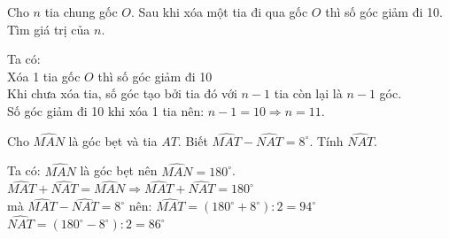 \begin{bt}
	Cho $n$ tia chung gốc $O$. Sau khi xóa một tia đi qua gốc $O$ thì số góc giảm đi 10. Tìm giá trị của $n$.
	\begin{loigiaichuong30}
		Ta có:\\
		Xóa 1 tia gốc $O$ thì số góc giảm đi 10\\
		Khi chưa xóa tia, số góc tạo bởi tia đó với $n-1$ tia còn lại là $n-1$ góc.\\
		Số góc giảm đi 10 khi xóa 1 tia nên: $n-1=10 \Rightarrow n=11$.
	\end{loigiaichuong30}
\end{bt}
\begin{bt}
	Cho $\widehat{MAN}$ là góc bẹt và tia $AT$. Biết $\widehat{MAT}-\widehat{NAT}={{8}^\circ}$. Tính $\widehat{NAT}$.
	\begin{loigiaichuong30}
		Ta có: $\widehat{MAN}$ là góc bẹt nên $\widehat{MAN}={{180}^\circ}$.\\
		$\widehat{MAT}+\widehat{NAT}=\widehat{MAN}\Rightarrow \widehat{MAT}+\widehat{NAT}={{180}^\circ}$\\
		mà  $\widehat{MAT}-\widehat{NAT}={{8}^\circ}$  nên:
		$\widehat{MAT}=\left({{180}^\circ}+{{8}^\circ}\right):2={{94}^\circ}$ \\ 
		$\widehat{NAT}=\left({{180}^\circ}-{{8}^\circ}\right):2={{86}^\circ}$ \\ 
	\end{loigiaichuong30}
\end{bt}
